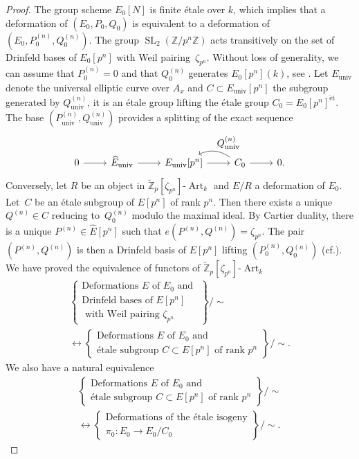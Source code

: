 \documentclass[11pt]{article}
\newcommand{\cf}{cf.\xspace}
\let\ts\textstyle
\newcommand{\et}{\mathrm{\acute{e}t}}
\newcommand{\univ}{\mathrm{univ}}
\numberwithin{equation}{section}
\theoremstyle{definition}
\newcommand{\bb}[1]{\mathbb{#1}}
\DeclareMathOperator{\SL}{SL}
\DeclareMathOperator{\Art}{Art}
\begin{document}
\begin{proof}
The group scheme $E_0[N]$ is finite étale over $k$, which implies that a deformation of $(E_0,P_0,Q_0)$ is equivalent to a deformation of $(E_0,P_0^{(n)},Q_0^{(n)})$. The group $\SL_2(\bb{Z}/p^n\bb{Z})$ acts transitively on the set of Drinfeld bases of $E_0[p^n]$ with Weil pairing~$\zeta_{p^n}$. Without loss of generality, we can assume that $P_0^{(n)}=0$ and that $Q_0^{(n)}$ generates $E_0[p^n](k)$, see \cite[Th.\,5.5.2]{katz1985arithmetic}. Let $E_{\univ}$ denote the universal elliptic curve over $A_{x}$ and $C\subset E_{\univ}[p^n]$ the subgroup generated by $Q^{(n)}_{\univ}$, it is an étale group lifting the étale group $C_0=E_0[p^n]^{\et}$. The base $(P_{\univ}^{(n)},Q_{\univ}^{(n)})$ provides a splitting of the exact sequence
\[
\begin{tikzcd}
0 \ar[r] & \widehat{E}_{\univ} \ar[r] & E_{\univ}[p^n] \ar[r, ] & C_0 \ar[r] \ar[l, bend right, "\ts Q_{\univ}^{(n)}"'] & 0.
\end{tikzcd}
\]
Conversely, let $R$ be an object in $\breve{\bb{Z}}_p[\zeta_{p^n}]\mbox{-}\Art_k$ and $E/R$ a deformation of $E_0$. Let~$C$ be an étale subgroup of $E[p^n]$ of rank $p^n$. Then there exists a unique $Q^{(n)}\in C$ reducing to~$Q_0^{(n)}$ modulo the maximal ideal. By Cartier duality, there is a unique \hbox{$P^{(n)}\!\in\!\widehat{E}[p^n]$} such that $e(P^{(n)}, Q^{(n)})=\zeta_{p^n}$. The pair $(P^{(n)},Q^{(n)})$ is then a Drinfeld basis of $E[p^n]$ lifting $(P^{(n)}_0,Q^{(n)}_0)$ (\cf \cite[Prop.\,1.11.2]{katz1985arithmetic}). We have proved the equivalence of functors of $\breve{\bb{Z}}_p[\zeta_{p^n}]\mbox{-}\Art_k$
\begin{multline*}
\left\{ \substack{ \mbox{Deformations $E$ of $E_0$ and } \\ \mbox{Drinfeld bases of $E[p^n]$} \\ \mbox{ with Weil pairing $\zeta_{p^n}$} } \right\}\!\bigg/\!\sim\\ \longleftrightarrow \left\{ \substack{ \mbox{Deformations $E$ of $E_0$ and } \\ \mbox{étale subgroup $C\subset E[p^n]$ of rank $p^n$} } \right\}\!\Big/\! \sim.
\end{multline*}
We also have a natural equivalence
\begin{multline*}
\left\{ \substack{ \mbox{Deformations $E$ of $E_0$ and } \\ \mbox{étale subgroup $C\subset E[p^n]$ of rank $p^n$} } \right\}\! \Big/\!\sim\\ \longleftrightarrow \left\{ \substack{ \mbox{Deformations of the étale isogeny} \\ 	\mbox{$\pi_0: E_0\to E_0/C_0$} }\right\}\! \Big/\!\sim.

\end{multline*}
\end{proof}
\end{document}
